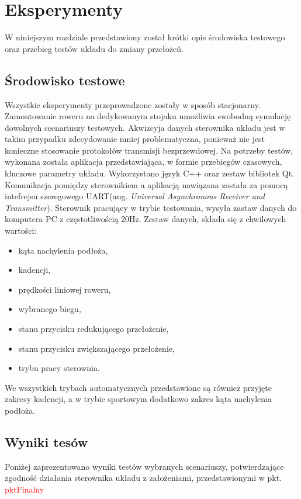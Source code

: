 \chapter{Eksperymenty}

W niniejszym rozdziale przedstawiony został krótki opis środowiska testowego oraz przebieg testów układu do zmiany przełożeń.

\section{Środowisko testowe}
Wszystkie eksperymenty przeprowadzone zostały w sposób stacjonarny. Zamontowanie roweru na dedykowanym stojaku umożliwia swobodną symulację dowolnych scenariuszy testowych. Akwizcyja danych sterownika układu jest w takim przypadku zdecydowanie mniej problematyczna, ponieważ nie jest konieczne stosowanie protokołów transmisji bezprzewdowej. 
Na potrzeby testów, wykonana została aplikacja przedstawiająca, w formie przebiegów czasowych, kluczowe parametry układu. Wykorzystano język C++ oraz zestaw bibliotek Qt. Komunikacja pomiędzy sterownikiem a aplikacją nawiązana została za pomocą intefrejsu szeregowego UART(ang. \textit{Universal Asynchronous Receiver and Transmitter}). Sterownik pracujący w trybie testowania, wysyła zastaw danych do komputera PC z częstotliwością 20Hz. Zestaw danych, składa się z chwilowych wartości:
\begin{itemize}
 \item
 kąta nachylenia podłoża,
 \item
 kadencji,
 \item
 prędkości liniowej roweru,
 \item
 wybranego biegu,
 \item
 stanu przycisku redukującego przełożenie,
 \item
 stanu przycisku zwiększającego przełożenie,
 \item
 trybu pracy sterownia.
 \end{itemize}
 
We wszystkich trybach automatycznych przedstawione są również przyjęte zakresy kadencji, a w trybie sportowym dodatkowo zakres kąta nachylenia podłoża.
 
\section{Wyniki tesów}

Poniżej zaprezentowano wyniki testów wybranych scenariuszy, potwierdzające zgodność działania sterownika układu z założeniami, przedstawionymi w pkt. \textcolor{red}{pktFinalny}
